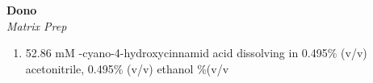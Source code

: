 \textbf{Dono} 
\\
\textit{Matrix Prep}
\begin{enumerate}
\item{52.86 mM \alpha-cyano-4-hydroxycinnamid acid dissolving in 0.495\% (v/v) acetonitrile, 0.495\% (v/v) ethanol \%(v/v}
\end{enumerate}
